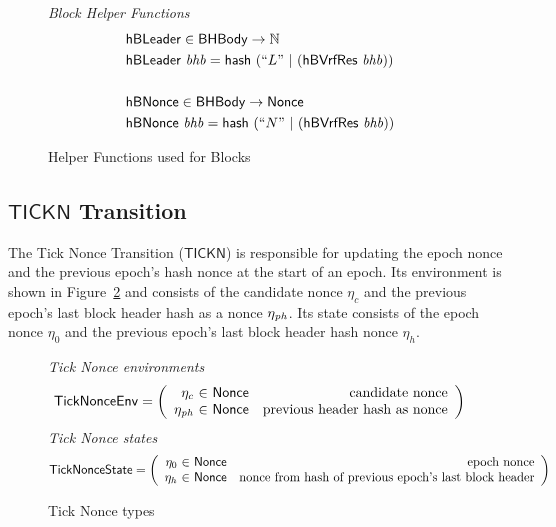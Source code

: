 \begin{figure}[htb]
  \emph{Block Helper Functions}
  \begin{align*}
      & \mathsf{hBLeader} \in \mathsf{BHBody} \to \mathbb{N} \\
      & \mathsf{hBLeader}~\mathit{bhb} = \mathsf{hash}~(``L"~|~(\mathsf{hBVrfRes}~\mathit{bhb}))\\
      \\
      & \mathsf{hBNonce} \in \mathsf{BHBody} \to \mathsf{Nonce} \\
      & \mathsf{hBNonce}~\mathit{bhb} = \mathsf{hash}~(``N"~|~(\mathsf{hBVrfRes}~\mathit{bhb}))\\
  \end{align*}
  \caption{Helper Functions used for Blocks}
  \label{fig:funcs:blocks-helper}
\end{figure}

\clearpage

\subsection{$\mathsf{TICKN}$ Transition}
\label{sec:tick-nonce-trans}

The Tick Nonce Transition ($\mathsf{TICKN}$) is responsible for updating the epoch nonce and the
previous epoch's hash nonce at the start of an epoch. Its environment is shown in
Figure~\ref{fig:ts-types:ticknonce} and consists of the candidate nonce $\eta_c$
and the previous epoch's last block header hash as a nonce $\eta_{\mathit{ph}}$.
Its state consists of the epoch nonce $\eta_0$ and the previous epoch's last block header hash nonce $\eta_h$.

\begin{figure}
  \emph{Tick Nonce environments}
  \begin{equation*}
    \TickNonceEnv =
    \left(
      \begin{array}{r@{~\in~}lr}
        \eta_c & \Nonce & \text{candidate nonce} \\
        \eta_\var{ph} & \Nonce & \text{previous header hash as nonce} \\
      \end{array}
    \right)
  \end{equation*}
  \emph{Tick Nonce states}
  \begin{equation*}
    \TickNonceState =
    \left(
      \begin{array}{r@{~\in~}lr}
        \eta_0 & \Nonce & \text{epoch nonce} \\
        \eta_h & \Nonce & \text{nonce from hash of previous epoch's last block header} \\
      \end{array}
    \right)
  \end{equation*}

  \caption{Tick Nonce types}
  \label{fig:ts-types:ticknonce}
\end{figure}

